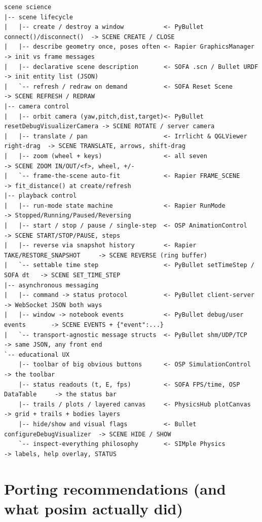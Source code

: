\documentclass[11pt]{article}
\begin{document}
\begin{lstlisting}
scene science
|-- scene lifecycle
|   |-- create / destroy a window           <- PyBullet connect()/disconnect()  -> SCENE CREATE / CLOSE
|   |-- describe geometry once, poses often <- Rapier GraphicsManager           -> init vs frame messages
|   |-- declarative scene description       <- SOFA .scn / Bullet URDF          -> init entity list (JSON)
|   `-- refresh / redraw on demand          <- SOFA Reset Scene                 -> SCENE REFRESH / REDRAW
|-- camera control
|   |-- orbit camera (yaw,pitch,dist,target)<- PyBullet resetDebugVisualizerCamera -> SCENE ROTATE / server camera
|   |-- translate / pan                     <- Irrlicht & QGLViewer right-drag  -> SCENE TRANSLATE, arrows, shift-drag
|   |-- zoom (wheel + keys)                 <- all seven                        -> SCENE ZOOM IN/OUT/<f>, wheel, +/-
|   `-- frame-the-scene auto-fit            <- Rapier FRAME_SCENE               -> fit_distance() at create/refresh
|-- playback control
|   |-- run-mode state machine              <- Rapier RunMode                   -> Stopped/Running/Paused/Reversing
|   |-- start / stop / pause / single-step  <- OSP AnimationControl             -> SCENE START/STOP/PAUSE, steps
|   |-- reverse via snapshot history        <- Rapier TAKE/RESTORE_SNAPSHOT     -> SCENE REVERSE (ring buffer)
|   `-- settable time step                  <- PyBullet setTimeStep / SOFA dt   -> SCENE SET_TIME_STEP
|-- asynchronous messaging
|   |-- command -> status protocol          <- PyBullet client-server           -> WebSocket JSON both ways
|   |-- window -> notebook events           <- PyBullet debug/user events       -> SCENE EVENTS + {"event":...}
|   `-- transport-agnostic message structs  <- PyBullet shm/UDP/TCP             -> same JSON, any front end
`-- educational UX
    |-- toolbar of big obvious buttons      <- OSP SimulationControl            -> the toolbar
    |-- status readouts (t, E, fps)         <- SOFA FPS/time, OSP DataTable     -> the status bar
    |-- trails / plots / layered canvas     <- PhysicsHub plotCanvas            -> grid + trails + bodies layers
    |-- hide/show and visual flags          <- Bullet configureDebugVisualizer  -> SCENE HIDE / SHOW
    `-- inspect-everything philosophy       <- SIMple Physics                   -> labels, help overlay, STATUS
\end{lstlisting}

\section{Porting recommendations (and what posim actually did)}
\end{document}
